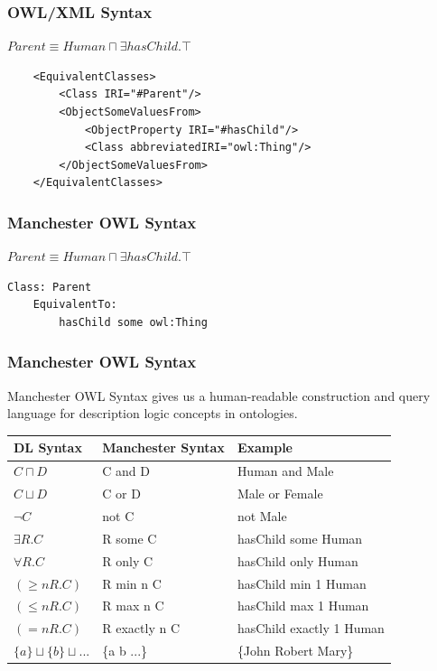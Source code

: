 \documentclass[aspectratio=169]{beamer} %
\begin{document}
\begin{frame}[fragile]
  \frametitle{OWL/XML Syntax}
  $Parent \equiv Human \sqcap \exists hasChild.\top$
{\tiny
\begin{verbatim}
    <EquivalentClasses>
        <Class IRI="#Parent"/>
        <ObjectSomeValuesFrom>
            <ObjectProperty IRI="#hasChild"/>
            <Class abbreviatedIRI="owl:Thing"/>
        </ObjectSomeValuesFrom>
    </EquivalentClasses>
\end{verbatim}
}
\end{frame}

\begin{frame}[fragile]
  \frametitle{Manchester OWL Syntax}
  $Parent \equiv Human \sqcap \exists hasChild.\top$
{\tiny
\begin{verbatim}
Class: Parent
    EquivalentTo: 
        hasChild some owl:Thing
\end{verbatim}
}
\end{frame}

\begin{frame}
  \frametitle{Manchester OWL Syntax}
  Manchester OWL Syntax gives us a human-readable construction and query language for description logic concepts in ontologies.
  \begin{table}[ht]
    \centering
    \begin{tabular}{|l|l|l|}
      \hline
      DL Syntax & Manchester Syntax & Example \\
      \hline
      $C \sqcap D$ & C and D & Human and Male \\
      $C \sqcup D$ & C or D & Male or Female \\
      $\neg C$ & not C & not Male \\
      $\exists R.C$ & R some C & hasChild some Human \\
      $\forall R.C$ & R only C & hasChild only Human \\
      $(\geq n R.C)$ & R min n C & hasChild min 1 Human \\
      $(\leq n R.C)$ & R max n C & hasChild max 1 Human \\
      $(= n R.C)$ & R exactly n C & hasChild exactly 1 Human \\
      $\{a\} \sqcup \{b\} \sqcup ...$ & \{a b ...\} & \{John Robert
                                                      Mary\} \\
      \hline
    \end{tabular}
  \end{table}
\end{frame}
\end{document}
